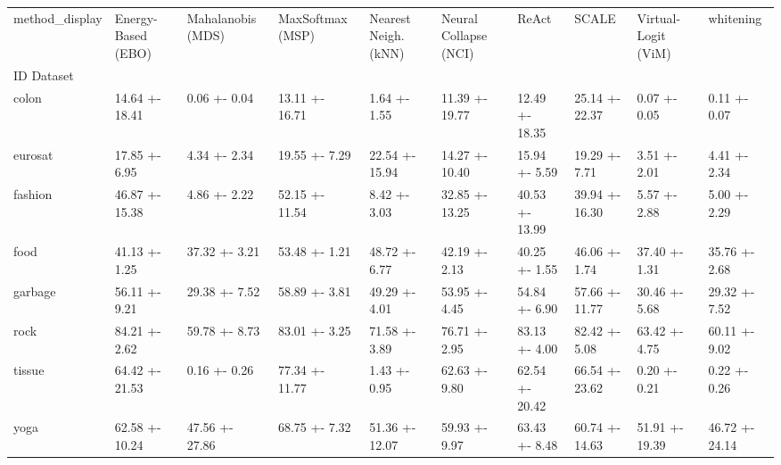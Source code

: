 \begin{tabular}{llllllllll}
\toprule
method_display & Energy-Based (EBO) & Mahalanobis (MDS) & MaxSoftmax (MSP) & Nearest Neigh. (kNN) & Neural Collapse (NCI) & ReAct & SCALE & Virtual-Logit (ViM) & whitening \\
ID Dataset &  &  &  &  &  &  &  &  &  \\
\midrule
colon & 14.64 +- 18.41 & 0.06 +- 0.04 & 13.11 +- 16.71 & 1.64 +- 1.55 & 11.39 +- 19.77 & 12.49 +- 18.35 & 25.14 +- 22.37 & 0.07 +- 0.05 & 0.11 +- 0.07 \\
eurosat & 17.85 +- 6.95 & 4.34 +- 2.34 & 19.55 +- 7.29 & 22.54 +- 15.94 & 14.27 +- 10.40 & 15.94 +- 5.59 & 19.29 +- 7.71 & 3.51 +- 2.01 & 4.41 +- 2.34 \\
fashion & 46.87 +- 15.38 & 4.86 +- 2.22 & 52.15 +- 11.54 & 8.42 +- 3.03 & 32.85 +- 13.25 & 40.53 +- 13.99 & 39.94 +- 16.30 & 5.57 +- 2.88 & 5.00 +- 2.29 \\
food & 41.13 +- 1.25 & 37.32 +- 3.21 & 53.48 +- 1.21 & 48.72 +- 6.77 & 42.19 +- 2.13 & 40.25 +- 1.55 & 46.06 +- 1.74 & 37.40 +- 1.31 & 35.76 +- 2.68 \\
garbage & 56.11 +- 9.21 & 29.38 +- 7.52 & 58.89 +- 3.81 & 49.29 +- 4.01 & 53.95 +- 4.45 & 54.84 +- 6.90 & 57.66 +- 11.77 & 30.46 +- 5.68 & 29.32 +- 7.52 \\
rock & 84.21 +- 2.62 & 59.78 +- 8.73 & 83.01 +- 3.25 & 71.58 +- 3.89 & 76.71 +- 2.95 & 83.13 +- 4.00 & 82.42 +- 5.08 & 63.42 +- 4.75 & 60.11 +- 9.02 \\
tissue & 64.42 +- 21.53 & 0.16 +- 0.26 & 77.34 +- 11.77 & 1.43 +- 0.95 & 62.63 +- 9.80 & 62.54 +- 20.42 & 66.54 +- 23.62 & 0.20 +- 0.21 & 0.22 +- 0.26 \\
yoga & 62.58 +- 10.24 & 47.56 +- 27.86 & 68.75 +- 7.32 & 51.36 +- 12.07 & 59.93 +- 9.97 & 63.43 +- 8.48 & 60.74 +- 14.63 & 51.91 +- 19.39 & 46.72 +- 24.14 \\
\bottomrule
\end{tabular}
